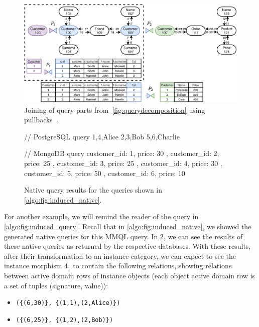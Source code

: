 \begin{figure}
\centering
\includegraphics[width=\textwidth]{img/fig_query-join.pdf} 
\caption{Joining of query parts from~\cref{fig:querydecomposition} using pullbacks~\cite{unified_representation}.}
\label{fig:querypullbacks}
\end{figure}

\begin{figure}
\begin{code}
// PostgreSQL query
1,4,Alice
2,3,Bob
5,6,Charlie

// MongoDB query
{ customer_id: 1, price: 30 },
{ customer_id: 2, price: 25 },
{ customer_id: 3, price: 25 },
{ customer_id: 4, price: 30 },
{ customer_id: 5, price: 50 },
{ customer_id: 6, price: 10 }
\end{code}
\caption{Native query results for the queries shown in \cref{algo:fig:induced_native}.}\label{algo:fig:induced_results}
\end{figure}

For another example, we will remind the reader of the query in \cref{algo:fig:induced_query}.
Recall that in \cref{algo:fig:induced_native}, we showed the generated native queries for this MMQL query.
In \cref{algo:fig:induced_results}, we can see the results of these native queries as returned by the respective databases.
With these results, after their transformation to an instance category, we can expect to see the instance morphism $4_1$ to contain the following relations, showing relations between active domain rows of instance objects (each object active domain row is a set of tuples (signature, value)):

\begin{itemize}
    \item \texttt{(\{(6,30)\}, \{(1,1),(2,Alice)\})}
    \item \texttt{(\{(6,25)\}, \{(1,2),(2,Bob)\})}
\end{itemize}

